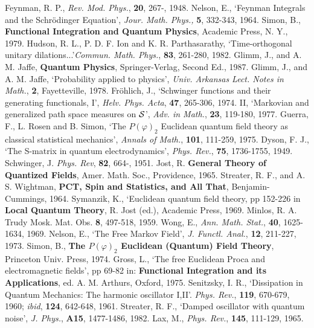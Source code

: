 \begin{thebibliography}{99}
 Feynman, R. P., {\em Rev. Mod. Phys.}, {\bf 20}, 267-,
1948.
 Nelson, E., `Feynman Integrals and the
Schr\"{o}dinger Equation', {\em Jour. Math. Phys.,} {\bf 5}, 332-343, 1964.
 Simon, B., {\bf Functional Integration and Quantum
Physics}, Academic Press, N. Y., 1979.
 Hudson, R. L., P. D. F. Ion and K. R. Parthasarathy,
`Time-orthogonal unitary dilations...'{\em Commun. Math. Phys.},
{\bf 83}, 261-280, 1982.
 Glimm, J., and A. M. Jaffe, {\bf Quantum Physics},
Springer-Verlag, Second Ed., 1987.
 Glimm, J., and A. M. Jaffe, `Probability applied to
physics', {\em Univ. Arkansas Lect. Notes in Math.}, {\bf 2},
Fayetteville, 1978.
 Fr\"{o}hlich, J., `Schwinger functions and their
generating functionals, I', {\em Helv. Phys. Acta}, {\bf 47}, 265-306, 1974.
II, `Markovian and generalized path space measures on ${\cal S}$',
{\em Adv. in Math.}, {\bf 23}, 119-180, 1977.
 Guerra, F., L. Rosen and B. Simon, `The $P(\varphi)_2$
Euclidean quantum field theory as classical statistical mechanics',
{\em Annals of Math.}, {\bf 101}, 111-259, 1975.
 Dyson, F. J., `The S-matrix in quantum electrodynamics',
{\em Phys. Rev.}, {\bf 75}, 1736-1755, 1949.
 Schwinger, J. {\em Phys. Rev}, {\bf 82}, 664-, 1951.
 Jost, R. {\bf General Theory of Quantized Fields}, Amer.
Math. Soc., Providence, 1965.
 Streater, R. F., and A. S. Wightman, {\bf PCT, Spin and Statistics,
and All That}, Benjamin-Cummings, 1964.
 Symanzik, K., `Euclidean quantum field theory, pp 152-226
in {\bf Local Quantum Theory}, R. Jost (ed.), Academic Press, 1969.
 Minlos, R. A. Trudy Mosk. Mat. Obs. {\bf 8}, 497-518, 1959.
 Wong, E., {\em Ann. Math. Stat.}, {\bf 40}, 1625-1634, 1969.
 Nelson, E., `The Free Markov Field', {\em J. Functl.
Anal.}, {\bf 12}, 211-227, 1973.
 Simon, B., {\bf The $P(\varphi)_2$ Euclidean (Quantum)
Field Theory}, Princeton Univ. Press, 1974.
 Gross, L., `The free Euclidean Proca and electromagnetic
fields', pp 69-82 in: {\bf Functional Integration and its
Applications}, ed. A. M. Arthurs, Oxford, 1975.
 Senitzsky, I. R., `Dissipation in Quantum Mechanics:
The harmonic oscillator I,II'. {\em Phys. Rev.}, {\bf 119}, 670-679,
1960; {\em ibid}, {\bf 124}, 642-648, 1961.
 Streater, R. F., `Damped oscillator with quantum noise',
{\em J. Phys.}, {\bf A15}, 1477-1486, 1982.
 Lax, M., {\em Phys. Rev.}, {\bf 145}, 111-129, 1965.

\end{thebibliography}
